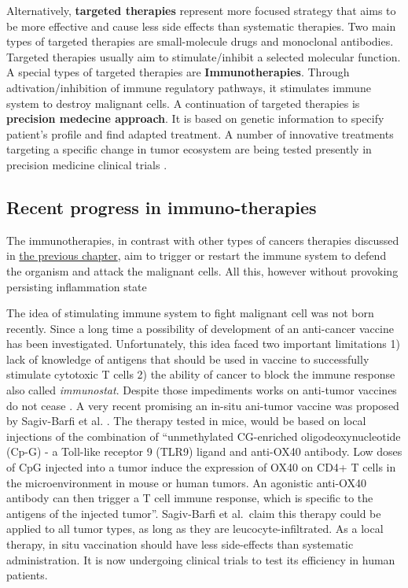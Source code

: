 \documentclass[12pt,]{book}
\theoremstyle{definition}
\theoremstyle{definition}
\theoremstyle{definition}
\theoremstyle{remark}
\begin{document}
Alternatively, \textbf{targeted therapies} represent more focused
strategy that aims to be more effective and cause less side effects than
systematic therapies. Two main types of targeted therapies are
small-molecule drugs and monoclonal antibodies. Targeted therapies
usually aim to stimulate/inhibit a selected molecular function. A
special types of targeted therapies are \textbf{Immunotherapies}.
Through adtivation/inhibition of immune regulatory pathways, it
stimulates immune system to destroy malignant cells. A continuation of
targeted therapies is \textbf{precision medecine approach}. It is based
on genetic information to specify patient's profile and find adapted
treatment. A number of innovative treatments targeting a specific change
in tumor ecosystem are being tested presently in precision medicine
clinical trials \citep{NCI2018}.

\hypertarget{recent-progress-in-immuno-therapies}{%
\subsection{Recent progress in
immuno-therapies}\label{recent-progress-in-immuno-therapies}}

The immunotherapies, in contrast with other types of cancers therapies
discussed in \protect\hyperlink{cancer_Therapies}{the previous chapter},
aim to trigger or restart the immune system to defend the organism and
attack the malignant cells. All this, however without provoking
persisting inflammation state \citep{Predina2013}

The idea of stimulating immune system to fight malignant cell was not
born recently. Since a long time a possibility of development of an
anti-cancer vaccine has been investigated. Unfortunately, this idea
faced two important limitations 1) lack of knowledge of antigens that
should be used in vaccine to successfully stimulate cytotoxic T cells 2)
the ability of cancer to block the immune response also called
\emph{immunostat}. Despite those impediments works on anti-tumor
vaccines do not cease \citep{Palucka2013}. A very recent promising an
in-situ ani-tumor vaccine was proposed by Sagiv-Barfi et al.
\citep{Sagiv-Barfi2018}. The therapy tested in mice, would be based on
local injections of the combination of ``unmethylated CG-enriched
oligodeoxynucleotide (Cp-G) - a Toll-like receptor 9 (TLR9) ligand and
anti-OX40 antibody. Low doses of CpG injected into a tumor induce the
expression of OX40 on CD4+ T cells in the microenvironment in mouse or
human tumors. An agonistic anti-OX40 antibody can then trigger a T cell
immune response, which is specific to the antigens of the injected
tumor''. Sagiv-Barfi et al.~claim this therapy could be applied to all
tumor types, as long as they are leucocyte-infiltrated. As a local
therapy, in situ vaccination should have less side-effects than
systematic administration. It is now undergoing clinical trials to test
its efficiency in human patients.
\end{document}
